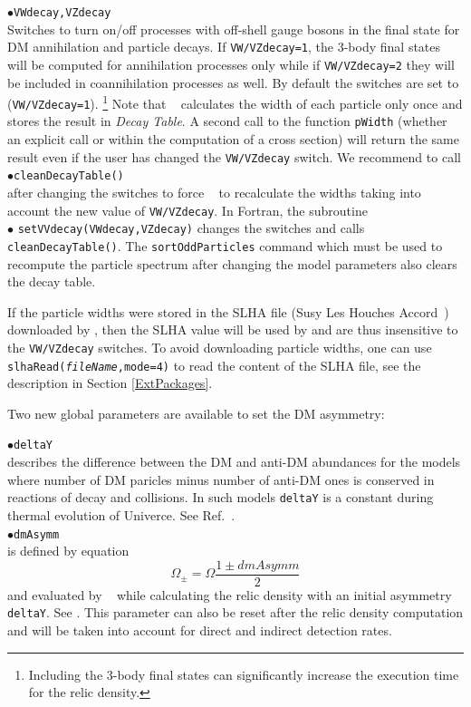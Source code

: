 \documentclass[12pt,a4paper]{article}
\begin{document}
\noindent
$\bullet$\verb|VWdecay,VZdecay|\\
Switches to turn on/off  processes with off-shell gauge bosons in the final state for DM annihilation and particle decays.
If \verb|VW/VZdecay=1|, the  3-body final states will be computed for annihilation processes only while 
if \verb|VW/VZdecay=2| they will be included in coannihilation processes as well.
By  default  the switches are set to (\verb|VW/VZdecay=1|). \footnote{Including the 3-body final states can significantly increase the execution time for the relic density.}
Note that \micro~ calculates the width of each particle only once and stores the
result in {\it Decay Table}.  A second call to the function \verb|pWidth| (whether an explicit call or within the computation of a cross section)   will return the same result  even if the user has changed the {\tt VW/VZdecay} switch.  
We recommend to call\\
$\bullet$\verb|cleanDecayTable()| \\
after changing the switches to force \micro~ to recalculate the widths taking into account  the new value of {\tt VW/VZdecay}.
In Fortran, the subroutine\\
$\bullet$ \verb|setVVdecay(VWdecay,VZdecay)| changes the
switches and calls {\tt cleanDecayTable()}.
The   {\tt sortOddParticles} command which must be used 
to recompute the particle spectrum after changing the model parameters also clears  the decay table.

If the particle widths  were stored in the SLHA file (Susy Les Houches Accord~\cite{Skands:2003cj})  downloaded by \micro, then the SLHA value will be used by and are thus insensitive to the {\tt VW/VZdecay} switches. To avoid downloading particle widths, one can use  {\tt slhaRead({\it fileName},mode=4)} to read the content of the SLHA file, see the description in Section \ref{ExtPackages}. 


Two new  global parameters are available to set  the DM asymmetry:

\noindent
$\bullet$\verb|deltaY|\\
describes the difference between the DM and anti-DM abundances for the
models where number of DM paricles minus number of anti-DM ones is conserved in
reactions of decay and collisions. In such models \verb|deltaY| is a
constant during thermal evolution of Univerce.  See Ref.~\cite{Belanger:2013oya}.\\
\noindent
$\bullet$\verb|dmAsymm|\\
is defined by equation 
$$ \Omega_{\pm} = \Omega\frac{1 \pm dmAsymm}{2}$$
and evaluated  by \micro~ while calculating the relic density  with an
initial asymmetry \verb|deltaY|. See \cite{Belanger:2013oya}. 
This parameter can also be reset  after the relic density 
computation and will be taken into account for direct and 
indirect detection rates.
\end{document}
